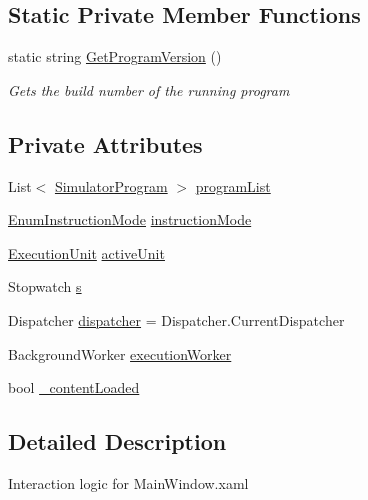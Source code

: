 \subsection*{Static Private Member Functions}
\begin{DoxyCompactItemize}
\item 
static string \hyperlink{class_c_p_u___o_s___simulator_1_1_main_window_a4871bf311e6341a2339deff4ad6c2648}{Get\+Program\+Version} ()
\begin{DoxyCompactList}\small\item\em Gets the build number of the running program \end{DoxyCompactList}\end{DoxyCompactItemize}
\subsection*{Private Attributes}
\begin{DoxyCompactItemize}
\item 
List$<$ \hyperlink{class_c_p_u___o_s___simulator_1_1_c_p_u_1_1_simulator_program}{Simulator\+Program} $>$ \hyperlink{class_c_p_u___o_s___simulator_1_1_main_window_a48fa4dc074c098338a652dbd6a3434c7}{program\+List}
\item 
\hyperlink{namespace_c_p_u___o_s___simulator_adc17a5a5e004084f05dc8e4d3f70e31f}{Enum\+Instruction\+Mode} \hyperlink{class_c_p_u___o_s___simulator_1_1_main_window_adcf36837be53f52843bbeb354a16d15c}{instruction\+Mode}
\item 
\hyperlink{class_c_p_u___o_s___simulator_1_1_c_p_u_1_1_execution_unit}{Execution\+Unit} \hyperlink{class_c_p_u___o_s___simulator_1_1_main_window_af00ce05444d9636c688974f706ef397b}{active\+Unit}
\item 
Stopwatch \hyperlink{class_c_p_u___o_s___simulator_1_1_main_window_a880dc01f7c4f093b77ace064d93be1f3}{s}
\item 
Dispatcher \hyperlink{class_c_p_u___o_s___simulator_1_1_main_window_a5115439e688bb7ed25f5237b266e4f3f}{dispatcher} = Dispatcher.\+Current\+Dispatcher
\item 
Background\+Worker \hyperlink{class_c_p_u___o_s___simulator_1_1_main_window_a80e0a87480e4b7f4cfdb47739985b7c7}{execution\+Worker}
\item 
bool \hyperlink{class_c_p_u___o_s___simulator_1_1_main_window_ae8269f86a68d5fdf06180686fc947cc6}{\+\_\+content\+Loaded}
\end{DoxyCompactItemize}


\subsection{Detailed Description}
Interaction logic for Main\+Window.\+xaml 

